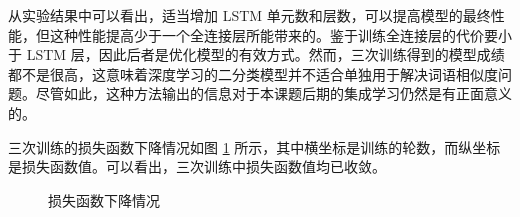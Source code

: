 从实验结果中可以看出，适当增加 LSTM 单元数和层数，可以提高模型的最终性能，但这种性能提高少于一个全连接层所能带来的。鉴于训练全连接层的代价要小于 LSTM 层，因此后者是优化模型的有效方式。然而，三次训练得到的模型成绩都不是很高，这意味着深度学习的二分类模型并不适合单独用于解决词语相似度问题。尽管如此，这种方法输出的信息对于本课题后期的集成学习仍然是有正面意义的。

三次训练的损失函数下降情况如图 \ref{f:classifer loss} 所示，其中横坐标是训练的轮数，而纵坐标是损失函数值。可以看出，三次训练中损失函数值均已收敛。

\begin{figure}[h]
	\centering
	\caption{损失函数下降情况}
	\label{f:classifer loss}
	\vspace{-1em}
\end{figure}